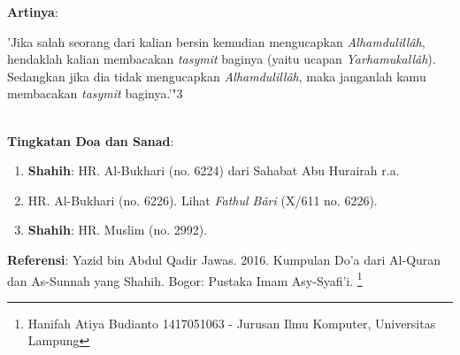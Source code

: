 \documentclass[a4paper,12pt]{article}
\begin{document}
\noindent
\textbf{Artinya}:
\par
\indent
'Jika salah seorang dari kalian bersin kemudian mengucapkan 
\textit{Alhamdulill\^{a}h}, hendaklah kalian membacakan \textit{tasymit} 
baginya (yaitu ucapan \textit{Yarhamukall\^{a}h}). Sedangkan jika dia tidak
mengucapkan \textit{Alhamdulill\^{a}h}, maka janganlah kamu membacakan 
\textit{tasymit} baginya.'"{\scriptsize 3}\\\\
\par
\noindent
\textbf{Tingkatan Doa dan Sanad}:
\begin{enumerate}
\item \textbf{Shahih}: HR. Al-Bukhari (no. 6224) dari Sahabat Abu Hurairah 
r.a.
\item HR. Al-Bukhari (no. 6226). Lihat \textit{Fathul B\^{a}ri} (X/611 no. 
6226).
\item \textbf{Shahih}: HR. Muslim (no. 2992).
\end{enumerate}
\textbf{Referensi}: Yazid bin Abdul Qadir Jawas. 2016. Kumpulan Do'a dari
Al-Quran dan As-Sunnah yang Shahih. Bogor: Pustaka Imam Asy-Syafi'i.
\footnote{Hanifah Atiya Budianto 1417051063 - Jurusan Ilmu Komputer,
Universitas Lampung}
\end{document}
